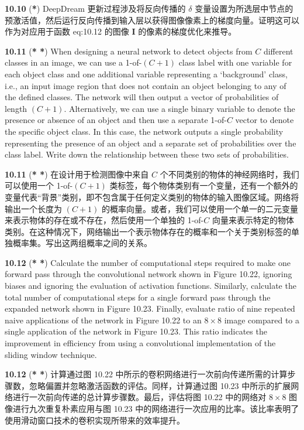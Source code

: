 \documentclass{article}
\begin{document}
\textbf{10.10} (\textbf{*}) DeepDream 更新过程涉及将反向传播的 $\delta$ 变量设置为所选层中节点的预激活值，然后运行反向传播到输入层以获得图像像素上的梯度向量。证明这可以作为对应用于函数 {eq:10.12} 的图像 $\mathbf{I}$ 的像素的梯度优化来推导。

\textbf{10.11} (\textbf{* *}) When designing a neural network to detect objects from $C$ different classes in an image, we can use a 1-of-$(C+1)$ class label with one variable for each object class and one additional variable representing a `background' class, i.e., an input image region that does not contain an object belonging to any of the defined classes. The network will then output a vector of probabilities of length $(C + 1)$. Alternatively, we can use a single binary variable to denote the presence or absence of an object and then use a separate 1-of-$C$ vector to denote the specific object class. In this case, the network outputs a single probability representing the presence of an object and a separate set of probabilities over the class label. Write down the relationship between these two sets of probabilities.

\textbf{10.11} (\textbf{* *}) 在设计用于检测图像中来自 $C$ 个不同类别的物体的神经网络时，我们可以使用一个 1-of-$(C+1)$ 类标签，每个物体类别有一个变量，还有一个额外的变量代表“背景”类别，即不包含属于任何定义类别的物体的输入图像区域。网络将输出一个长度为 $(C + 1)$ 的概率向量。或者，我们可以使用一个单一的二元变量来表示物体的存在或不存在，然后使用一个单独的 1-of-$C$ 向量来表示特定的物体类别。在这种情况下，网络输出一个表示物体存在的概率和一个关于类别标签的单独概率集。写出这两组概率之间的关系。

\textbf{10.12} (\textbf{* *}) Calculate the number of computational steps required to make one forward pass through the convolutional network shown in Figure 10.22, ignoring biases and ignoring the evaluation of activation functions. Similarly, calculate the total number of computational steps for a single forward pass through the expanded network shown in Figure 10.23. Finally, evaluate ratio of nine repeated naive applications of the network in Figure 10.22 to an $8 \times 8$ image compared to a single application of the network in Figure 10.23. This ratio indicates the improvement in efficiency from using a convolutional implementation of the sliding window technique.

\textbf{10.12} (\textbf{* *}) 计算通过图 10.22 中所示的卷积网络进行一次前向传递所需的计算步骤数，忽略偏置并忽略激活函数的评估。同样，计算通过图 10.23 中所示的扩展网络进行一次前向传递的总计算步骤数。最后，评估将图 10.22 中的网络对 $8 \times 8$ 图像进行九次重复朴素应用与图 10.23 中的网络进行一次应用的比率。该比率表明了使用滑动窗口技术的卷积实现所带来的效率提升。
\end{document}
